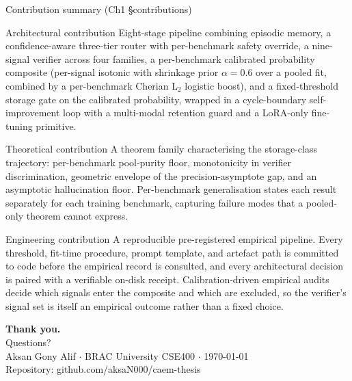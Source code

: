 \documentclass[10pt,aspectratio=169]{beamer}
\begin{document}
\begin{frame}{Contribution summary (Ch1 \S contributions)}
  \begin{block}{Architectural contribution}
    Eight-stage pipeline combining episodic memory, a confidence-aware three-tier router with per-benchmark safety override, a nine-signal verifier across four families, a per-benchmark calibrated probability composite (per-signal isotonic with shrinkage prior $\alpha{=}0.6$ over a pooled fit, combined by a per-benchmark Cherian L$_2$ logistic boost), and a fixed-threshold storage gate on the calibrated probability, wrapped in a cycle-boundary self-improvement loop with a multi-modal retention guard and a LoRA-only fine-tuning primitive.
  \end{block}

  \begin{block}{Theoretical contribution}
    A theorem family characterising the storage-class trajectory: per-benchmark pool-purity floor, monotonicity in verifier discrimination, geometric envelope of the precision-asymptote gap, and an asymptotic hallucination floor. Per-benchmark generalisation states each result separately for each training benchmark, capturing failure modes that a pooled-only theorem cannot express.
  \end{block}

  \begin{block}{Engineering contribution}
    A reproducible pre-registered empirical pipeline. Every threshold, fit-time procedure, prompt template, and artefact path is committed to code before the empirical record is consulted, and every architectural decision is paired with a verifiable on-disk receipt. Calibration-driven empirical audits decide which signals enter the composite and which are excluded, so the verifier's signal set is itself an empirical outcome rather than a fixed choice.
  \end{block}
\end{frame}

\begin{frame}
  \centering
  \vspace{1.5cm}
  {\Huge\textbf{Thank you.}}\\[0.8em]
  {\large Questions?}\\[1.5em]
  {\small Aksan Gony Alif \quad $\cdot$ \quad BRAC University CSE400 \quad $\cdot$ \quad \today}\\[1em]
  {\footnotesize Repository: github.com/aksaN000/caem-thesis}
\end{frame}
\end{document}
